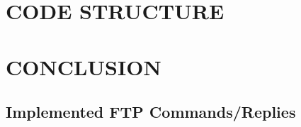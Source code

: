 \documentclass[10pt,twocolumn]{witseiepaper}
\begin{document}
\section{CODE STRUCTURE}

\section{CONCLUSION}


%



\newpage
\onecolumn


\begin{appendix}
	
\setcounter{figure}{0} \renewcommand{\thefigure}{A\arabic{figure}}
	
\section{Implemented FTP Commands/Replies} \label{sec:comm-replyTable}


\end{appendix}
\end{document}
